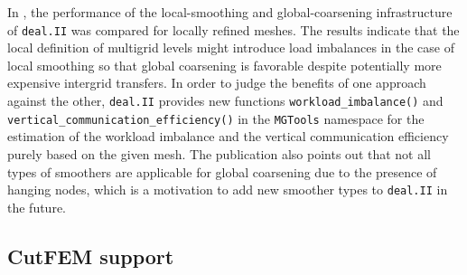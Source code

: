 \documentclass{ansarticle-preprint}
\newcommand{\specialword}[1]{\texttt{#1}}
\newcommand{\dealii}{{\specialword{deal.II}}\xspace}
\begin{document}
In \cite{munch2022gc}, the performance of the local-smoothing and global-coarsening
infrastructure of \texttt{deal.II} was compared for locally refined meshes. The results indicate that
the local definition of multigrid levels might introduce load imbalances
in the case of local smoothing so that global coarsening is favorable despite
potentially more expensive intergrid transfers. In order to judge the benefits
of one approach against the other, \texttt{deal.II} provides new functions
\texttt{workload\_imbalance()} and \texttt{vertical\_communication\_efficiency()}
in the \texttt{MGTools} namespace for the  estimation of the workload imbalance and the
vertical communication efficiency purely based on the given mesh. The publication \cite{munch2022gc} also points out that not
all types of smoothers are applicable for global coarsening due to the
presence of hanging nodes, which is a motivation to add new smoother types
to \dealii in the future.

\subsection{CutFEM support}\label{sec:cut}
\end{document}
